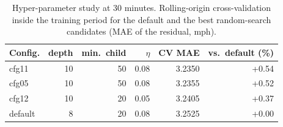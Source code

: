 \begin{table}[t]
\centering
\caption{Hyper-parameter study at 30 minutes. Rolling-origin cross-validation inside the training period for the default and the best random-search candidates (MAE of the residual, mph).}
\label{tab:tuning}
\small
\begin{tabular}{@{}lrrrrr@{}}
\toprule
Config. & depth & min.\ child & $\eta$ & CV MAE & vs.\ default (\%) \\
\midrule
cfg11 & 10 & 50 & 0.08 & 3.2350 & +0.54 \\
cfg05 & 10 & 50 & 0.08 & 3.2355 & +0.52 \\
cfg12 & 10 & 20 & 0.05 & 3.2405 & +0.37 \\
default & 8 & 20 & 0.08 & 3.2525 & +0.00 \\
\bottomrule
\end{tabular}
\end{table}
